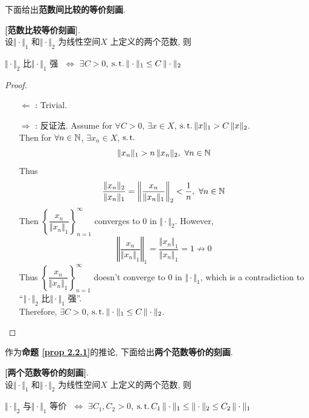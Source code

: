 	下面给出\textbf{范数间比较的等价刻画}. 
	\begin{proposition}\label{prop 2.2.1}
		\textbf{[范数比较等价刻画]}. \\
		设$\Vert \cdot \Vert_1$ 和$\Vert \cdot \Vert_2$ 为线性空间$X$ 上定义的两个范数, 则
		\begin{center}
			$\Vert \cdot \Vert_2$ 比$\Vert \cdot \Vert_1$ 强 $\,\, \Leftrightarrow \,\, \exists C > 0$, $\operatorname{s.t.} \Vert \cdot \Vert_1 \leq C \, \Vert \cdot \Vert_2$
		\end{center}
		
		\vspace{4em}
		
		\begin{proof}
			\begin{enumerate}
				\item[$\Leftarrow$]: Trivial. 
				
				\vspace{2em}
				
				\item[$\Rightarrow$]: 反证法. Assume for $\forall C > 0$, $\exists x \in X$, $\operatorname{s.t.} \Vert x \Vert_1 > C \, \Vert x \Vert_2$. \\
				Then for $\forall n \in \mathbb{N}$, $\exists x_n \in X$, $\operatorname{s.t.}$
				\[ \Vert x_n \Vert_1 > n \, \Vert x_n \Vert_2 , \,\, \forall n \in \mathbb{N} \]
				Thus
				\[ \frac{\Vert x_n \Vert_2}{\Vert x_n \Vert_1} = \left\Vert \frac{x_n}{\Vert x_n \Vert_1} \right\Vert_2 < \frac{1}{n} , \,\, \forall n \in \mathbb{N} \]
				Then $\left\{ \dfrac{x_n}{\Vert x_n \Vert_1} \right\}_{n = 1}^{\infty}$ converges to $0$ in $\Vert \cdot \Vert_2$. However, 
				\[ \left\Vert \frac{x_n}{\Vert x_n \Vert_1} \right\Vert_1 = \frac{\Vert x_n \Vert_1}{\Vert x_n \Vert_1} = 1 \not\to 0 \]
				Thus $\left\{ \dfrac{x_n}{\Vert x_n \Vert_1} \right\}_{n = 1}^{\infty}$ doesn't converge to $0$ in $\Vert \cdot \Vert_1$, which is a contradiction to “$\Vert \cdot \Vert_2$ 比$\Vert \cdot \Vert_1$ 强”. \\
				Therefore, $\exists C > 0$, $\operatorname{s.t.} \Vert \cdot \Vert_1 \leq C \, \Vert \cdot \Vert_2$.
			\end{enumerate}
		\end{proof}
	\end{proposition}

	\vspace{10em}
	
	作为\textbf{命题 \ref{prop 2.2.1}}的推论, 下面给出\textbf{两个范数等价的刻画}. 
	\begin{corollary}\label{cor 2.2.1}
		\textbf{[两个范数等价的刻画]}. \\
		设$\Vert \cdot \Vert_1$ 和$\Vert \cdot \Vert_2$ 为线性空间$X$ 上定义的两个范数, 则
		\begin{center}
			$\Vert \cdot \Vert_2$ 与$\Vert \cdot \Vert_1$ 等价 $\,\, \Leftrightarrow \,\, \exists C_1 , C_2 > 0$, $\operatorname{s.t.} C_1 \, \Vert \cdot \Vert_1 \leq \Vert \cdot \Vert_2 \leq C_2 \, \Vert \cdot \Vert_1$
		\end{center}
	\end{corollary}

